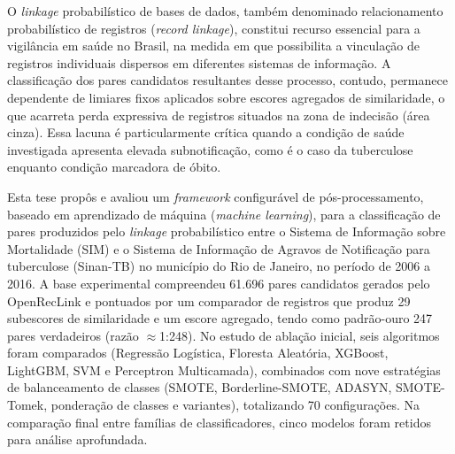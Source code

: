 \documentclass[12pt,a4paper,openany]{book}
\begin{document}
O \textit{linkage} probabilístico de bases de dados, também denominado relacionamento probabilístico de registros (\textit{record linkage}), constitui recurso essencial para a vigilância em saúde no Brasil, na medida em que possibilita a vinculação de registros individuais dispersos em diferentes sistemas de informação.
A classificação dos pares candidatos resultantes desse processo, contudo, permanece dependente de limiares fixos aplicados sobre escores agregados de similaridade, o que acarreta perda expressiva de registros situados na zona de indecisão (área cinza).
Essa lacuna é particularmente crítica quando a condição de saúde investigada apresenta elevada subnotificação, como é o caso da tuberculose enquanto condição marcadora de óbito.

Esta tese propôs e avaliou um \textit{framework} configurável de pós-processamento, baseado em aprendizado de máquina (\textit{machine learning}), para a classificação de pares produzidos pelo \textit{linkage} probabilístico entre o Sistema de Informação sobre Mortalidade (SIM) e o Sistema de Informação de Agravos de Notificação para tuberculose (Sinan-TB) no município do Rio de Janeiro, no período de 2006 a 2016.
A base experimental compreendeu 61.696 pares candidatos gerados pelo OpenRecLink e pontuados por um comparador de registros que produz 29 subescores de similaridade e um escore agregado, tendo como padrão-ouro 247 pares verdadeiros (razão $\approx$1:248).
No estudo de ablação inicial, seis algoritmos foram comparados (Regressão Logística, Floresta Aleatória, XGBoost, LightGBM, SVM e Perceptron Multicamada), combinados com nove estratégias de balanceamento de classes (SMOTE, Borderline-SMOTE, ADASYN, SMOTE-Tomek, ponderação de classes e variantes), totalizando 70 configurações. Na comparação final entre famílias de classificadores, cinco modelos foram retidos para análise aprofundada.
\end{document}
